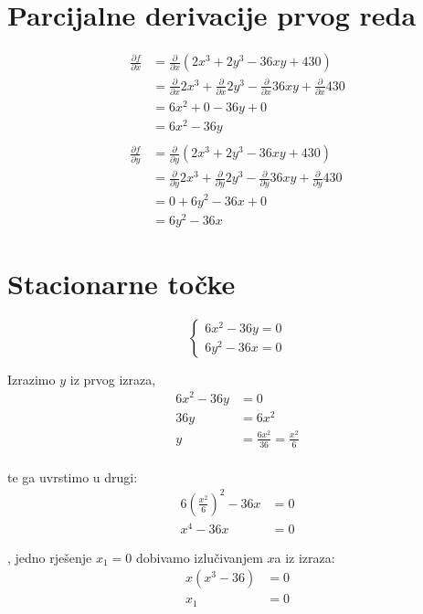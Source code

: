 \documentclass[12pt,a4paper]{report}
\begin{document}
\section{Parcijalne derivacije prvog reda}

\begin{align*}
    \frac{\partial f}{\partial x} & = \frac{\partial}{\partial x} (2x^3 + 2y^3 - 36xy + 430) \\
    & = \frac{\partial}{\partial x} 2x^3 + \frac{\partial}{\partial x}2y^3 - \frac{\partial}{\partial x}36xy + \frac{\partial}{\partial x}430 \\
    & = 6x^2 + 0 - 36y + 0 \\
    & = 6x^2 - 36y \\
    \\
    \frac{\partial f}{\partial y} & = \frac{\partial}{\partial y} (2x^3 + 2y^3 - 36xy + 430) \\
    & = \frac{\partial}{\partial y} 2x^3 + \frac{\partial}{\partial y}2y^3 - \frac{\partial}{\partial y}36xy + \frac{\partial}{\partial y}430 \\
    & = 0 + 6y^2 - 36x + 0\\
    & = 6y^2 - 36x
\end{align*}

\section{Stacionarne točke}

$$
\begin{cases}
    6x^2 - 36y = 0 \\
    6y^2 - 36x = 0
\end{cases}
$$

Izrazimo $y$ iz prvog izraza,
\begin{align*}
    6x^2 - 36y &= 0 \\
    36y & = 6x^2 \\
    y & = \frac{6x^2}{36} = \frac{x^2}{6} \\
\end{align*}

te ga uvrstimo u drugi:
\begin{align*}
    6(\frac{x^2}{6})^2 - 36x & = 0 \\
    x^4 - 36x & = 0
\end{align*}

, jedno rješenje $x_1 = 0$ dobivamo izlučivanjem $x$a iz izraza:
\begin{align*}
    x(x^3 - 36) &= 0 \\
    x_1 &= 0
\end{align*}
\end{document}
